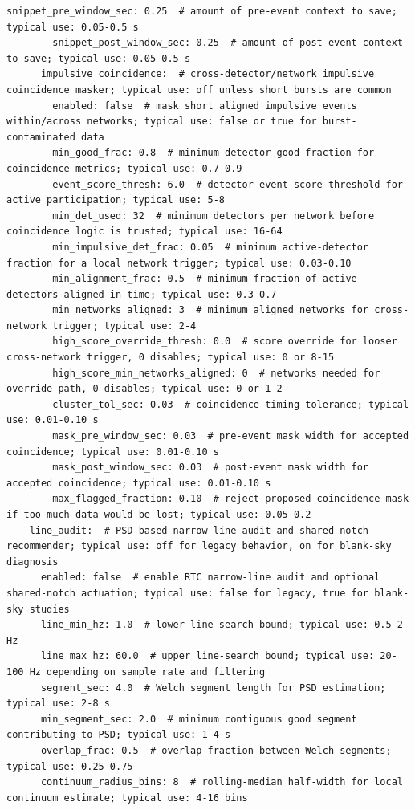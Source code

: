 \documentclass[11pt]{article}
\begin{document}
\begin{lstlisting}[language={}]
        snippet_pre_window_sec: 0.25  # amount of pre-event context to save; typical use: 0.05-0.5 s
        snippet_post_window_sec: 0.25  # amount of post-event context to save; typical use: 0.05-0.5 s
      impulsive_coincidence:  # cross-detector/network impulsive coincidence masker; typical use: off unless short bursts are common
        enabled: false  # mask short aligned impulsive events within/across networks; typical use: false or true for burst-contaminated data
        min_good_frac: 0.8  # minimum detector good fraction for coincidence metrics; typical use: 0.7-0.9
        event_score_thresh: 6.0  # detector event score threshold for active participation; typical use: 5-8
        min_det_used: 32  # minimum detectors per network before coincidence logic is trusted; typical use: 16-64
        min_impulsive_det_frac: 0.05  # minimum active-detector fraction for a local network trigger; typical use: 0.03-0.10
        min_alignment_frac: 0.5  # minimum fraction of active detectors aligned in time; typical use: 0.3-0.7
        min_networks_aligned: 3  # minimum aligned networks for cross-network trigger; typical use: 2-4
        high_score_override_thresh: 0.0  # score override for looser cross-network trigger, 0 disables; typical use: 0 or 8-15
        high_score_min_networks_aligned: 0  # networks needed for override path, 0 disables; typical use: 0 or 1-2
        cluster_tol_sec: 0.03  # coincidence timing tolerance; typical use: 0.01-0.10 s
        mask_pre_window_sec: 0.03  # pre-event mask width for accepted coincidence; typical use: 0.01-0.10 s
        mask_post_window_sec: 0.03  # post-event mask width for accepted coincidence; typical use: 0.01-0.10 s
        max_flagged_fraction: 0.10  # reject proposed coincidence mask if too much data would be lost; typical use: 0.05-0.2
    line_audit:  # PSD-based narrow-line audit and shared-notch recommender; typical use: off for legacy behavior, on for blank-sky diagnosis
      enabled: false  # enable RTC narrow-line audit and optional shared-notch actuation; typical use: false for legacy, true for blank-sky studies
      line_min_hz: 1.0  # lower line-search bound; typical use: 0.5-2 Hz
      line_max_hz: 60.0  # upper line-search bound; typical use: 20-100 Hz depending on sample rate and filtering
      segment_sec: 4.0  # Welch segment length for PSD estimation; typical use: 2-8 s
      min_segment_sec: 2.0  # minimum contiguous good segment contributing to PSD; typical use: 1-4 s
      overlap_frac: 0.5  # overlap fraction between Welch segments; typical use: 0.25-0.75
      continuum_radius_bins: 8  # rolling-median half-width for local continuum estimate; typical use: 4-16 bins

\end{lstlisting}
\end{document}

